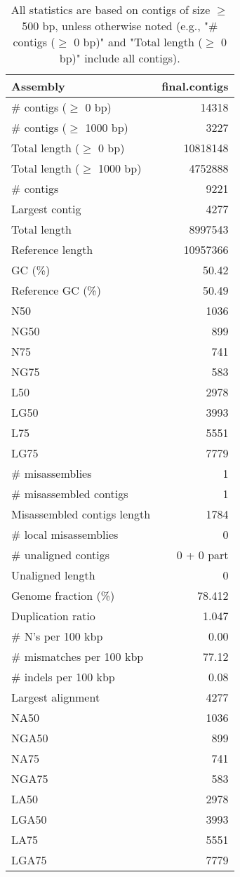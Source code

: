 \documentclass[12pt,a4paper]{article}
\begin{document}
\begin{table}[ht]
\begin{center}
\caption{All statistics are based on contigs of size $\geq$ 500 bp, unless otherwise noted (e.g., "\# contigs ($\geq$ 0 bp)" and "Total length ($\geq$ 0 bp)" include all contigs).}
\begin{tabular}{|l*{1}{|r}|}
\hline
Assembly & final.contigs \\ \hline
\# contigs ($\geq$ 0 bp) & 14318 \\ \hline
\# contigs ($\geq$ 1000 bp) & 3227 \\ \hline
Total length ($\geq$ 0 bp) & 10818148 \\ \hline
Total length ($\geq$ 1000 bp) & 4752888 \\ \hline
\# contigs & 9221 \\ \hline
Largest contig & 4277 \\ \hline
Total length & 8997543 \\ \hline
Reference length & 10957366 \\ \hline
GC (\%) & 50.42 \\ \hline
Reference GC (\%) & 50.49 \\ \hline
N50 & 1036 \\ \hline
NG50 & 899 \\ \hline
N75 & 741 \\ \hline
NG75 & 583 \\ \hline
L50 & 2978 \\ \hline
LG50 & 3993 \\ \hline
L75 & 5551 \\ \hline
LG75 & 7779 \\ \hline
\# misassemblies & 1 \\ \hline
\# misassembled contigs & 1 \\ \hline
Misassembled contigs length & 1784 \\ \hline
\# local misassemblies & 0 \\ \hline
\# unaligned contigs & 0 + 0 part \\ \hline
Unaligned length & 0 \\ \hline
Genome fraction (\%) & 78.412 \\ \hline
Duplication ratio & 1.047 \\ \hline
\# N's per 100 kbp & 0.00 \\ \hline
\# mismatches per 100 kbp & 77.12 \\ \hline
\# indels per 100 kbp & 0.08 \\ \hline
Largest alignment & 4277 \\ \hline
NA50 & 1036 \\ \hline
NGA50 & 899 \\ \hline
NA75 & 741 \\ \hline
NGA75 & 583 \\ \hline
LA50 & 2978 \\ \hline
LGA50 & 3993 \\ \hline
LA75 & 5551 \\ \hline
LGA75 & 7779 \\ \hline
\end{tabular}
\end{center}
\end{table}
\end{document}

